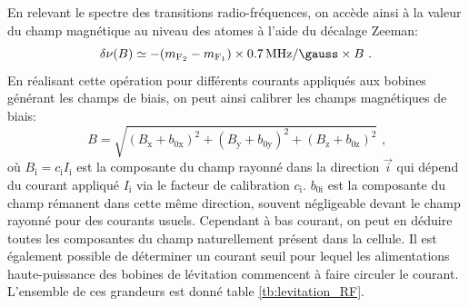 En relevant le spectre des transitions radio-fréquences, on accède ainsi à la valeur du champ magnétique au niveau des atomes à l'aide du décalage Zeeman:
\begin{equation}
\delta \nu (B)\simeq -(m_{\mathrm{F_2}} - m_{\mathrm{F_1}} ) \times \SI{0.7}{\mega\hertz\per\gauss} \times B \text{ .}
\label{eq:levitation_RF}
\end{equation}
En réalisant cette opération pour différents courants appliqués aux bobines générant les champs de biais, on peut ainsi calibrer les champs magnétiques de biais:
\begin{equation}
B=\sqrt{(B_{\mathrm{x}}+b_{\mathrm{0x}})^2+(B_{\mathrm{y}}+b_{\mathrm{0y}})^2+(B_{\mathrm{z}}+b_{\mathrm{0z}})^2} \text{ ,}
\end{equation}
où $B_{\mathrm{i}}=c_{\mathrm{i}} I_{\mathrm{i}}$ est la composante du champ rayonné dans la direction $\vec{i}$ qui dépend du courant appliqué $I_{\mathrm{i}}$ via le facteur de calibration $c_{\mathrm{i}}$. $b_{\mathrm{0i}}$ est la composante du champ rémanent dans cette même direction, souvent négligeable devant le champ rayonné pour des courants usuels. Cependant à bas courant, on peut en déduire toutes les composantes du champ naturellement présent dans la cellule. Il est également possible de déterminer un courant seuil pour lequel les alimentations haute-puissance des bobines de lévitation commencent à faire circuler le courant. L'ensemble de ces grandeurs est donné table \ref{tb:levitation_RF}.

